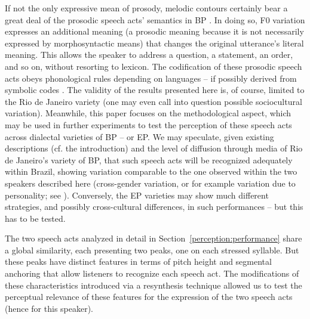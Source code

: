 \documentclass[output=paper]{LSP/langsci}
\begin{document}
If not the only expressive mean of prosody, melodic contours certainly bear a great deal of the prosodic speech acts' semantics in BP \citep{moraes2014}. 
In doing so, F0 variation expresses an additional meaning (a prosodic meaning because it is not necessarily expressed by morphosyntactic means) that changes the original utterance's literal meaning. 
This allows the speaker to address a question, a statement, an order, and so on, without resorting to lexicon. 
The codification of these prosodic speech acts obeys phonological rules depending on languages -- if possibly derived from symbolic codes \citep{ohala1983,bolinger1986intonation}.
The validity of the results presented here is, of course, limited to the Rio de Janeiro variety (one may even call into question possible sociocultural variation).
Meanwhile, this paper focuses on the methodological aspect, which may be used in further experiments to test the perception of these speech acts across dialectal varieties of BP -- or EP. 
We may speculate, given existing descriptions (cf. the introduction) and the level of diffusion through media of Rio de Janeiro’s variety of BP, that such speech acts will be recognized adequately within Brazil, showing variation comparable to the one observed within the two speakers described here (cross-gender variation, or for example variation due to personality; see \citealt{rilliard2016}).
Conversely, the EP varieties may show much different strategies, and possibly cross-cultural differences, in such performances -- but this has to be tested.


The two speech acts analyzed in detail in Section~\ref{perception:performance} share a global similarity, each presenting two peaks, one on each stressed syllable. 
But these peaks have distinct features in terms of pitch height and segmental anchoring that allow listeners to recognize each speech act. 
The modifications of these characteristics introduced via a resynthesis technique allowed us to test the perceptual relevance of these features for the expression of the two speech acts (hence for this speaker).
\end{document}
